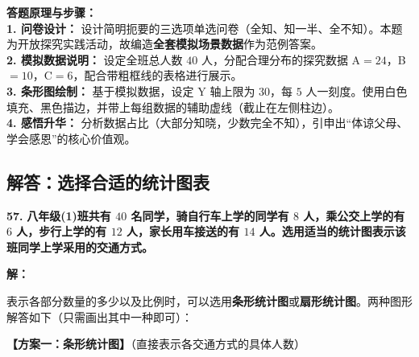 \vspace{0.4cm}
{\small\color{blue!70!black}
\textbf{答题原理与步骤：}\\
\textbf{1. 问卷设计：} 设计简明扼要的三选项单选问卷（全知、知一半、全不知）。本题为开放探究实践活动，故编造\textbf{全套模拟场景数据}作为范例答案。\\
\textbf{2. 模拟数据说明：} 设定全班总人数 $40$ 人，分配合理分布的探究数据 A$=24$，B$=10$，C$=6$，配合带粗框线的表格进行展示。\\
\textbf{3. 条形图绘制：} 基于模拟数据，设定 Y 轴上限为 $30$，每 $5$ 人一刻度。使用白色填充、黑色描边，并带上每组数据的辅助虚线（截止在左侧柱边）。\\
\textbf{4. 感悟升华：} 分析数据占比（大部分知晓，少数完全不知），引申出“体谅父母、学会感恩”的核心价值观。
}

\newpage

\newpage

\subsection{解答：选择合适的统计图表}

\vspace{0.6cm}

\textbf{\LARGE 57.} \textbf{八年级(1)班共有 $40$ 名同学，骑自行车上学的同学有 $8$ 人，乘公交上学的有 $6$ 人，步行上学的有 $12$ 人，家长用车接送的有 $14$ 人。选用适当的统计图表示该班同学上学采用的交通方式。}

\vspace{0.4cm}
\textbf{解：}

表示各部分数量的多少以及比例时，可以选用\textbf{条形统计图}或\textbf{扇形统计图}。两种图形解答如下（只需画出其中一种即可）：

\vspace{0.4cm}
\textbf{【方案一：条形统计图】}（直接表示各交通方式的具体人数）

